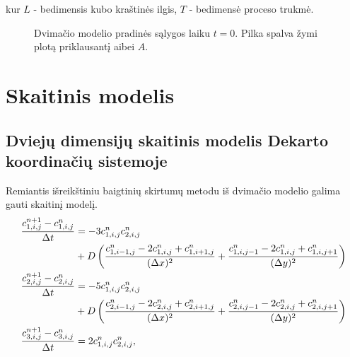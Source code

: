 \documentclass{VUMIFInfKursinis}
\begin{document}
kur $L$ - bedimensis kubo kraštinės ilgis, $T$ - bedimensė proceso trukmė.

\begin{figure}[h!]
    \centering
    \caption{Dvimačio modelio pradinės sąlygos laiku $t=0$. Pilka spalva žymi plotą priklausantį aibei $A$. }
\end{figure}

\section{Skaitinis modelis}



\newpage
\subsection{Dviejų dimensijų skaitinis modelis Dekarto koordinačių sistemoje}

Remiantis išreikštiniu baigtinių skirtumų metodu iš dvimačio modelio galima gauti skaitinį modelį.
\begin{subequations} \label{numerical-eqs}
\begin{align}
\frac{c^{n+1}_{1,i,j}-c^n_{1,i,j}}{\Delta t}&=
-3c^{n}_{1,i,j}c^{n}_{2,i,j}\notag\\
&+D\left(\frac{c^n_{1,i-1,j}-2c^n_{1,i,j}+c^n_{1,i+1,j}}{(\Delta x)^2}+\frac{c^n_{1,i,j-1}-2c^n_{1,i,j}+c^n_{1,i,j+1}}{(\Delta y)^2}\right)\\
\frac{c^{n+1}_{2,i,j}-c^n_{2,i,j}}{\Delta t}&=
-5c^{n}_{1,i,j}c^{n}_{2,i,j}\notag\\
&+D\left(\frac{c^n_{2,i-1,j}-2c^n_{2,i,j}+c^n_{2,i+1,j}}{(\Delta x)^2}+\frac{c^n_{2,i,j-1}-2c^n_{2,i,j}+c^n_{2,i,j+1}}{(\Delta y)^2}\right)\\
\frac{c^{n+1}_{3,i,j}-c^n_{3,i,j}}{\Delta t}&=2c^{n}_{1,i,j}c^{n}_{2,i,j},
\end{align}
\end{subequations}
\end{document}

